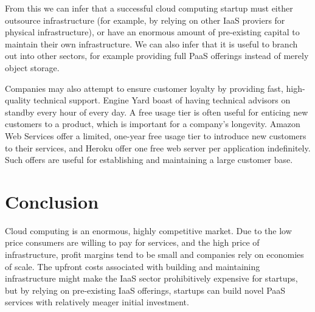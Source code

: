 \documentclass[a4paper]{proc}
\begin{document}
  From this we can infer that a successful cloud computing startup must either outsource infrastructure (for example, by relying on other IaaS proviers for physical infrastructure), or have an enormous amount of pre-existing capital to maintain their own infrastructure. We can also infer that it is useful to branch out into other sectors, for example providing full PaaS offerings instead of merely object storage.

  Companies may also attempt to ensure customer loyalty by providing fast, high-quality technical support. Engine Yard boast of having technical advisors on standby every hour of every day. A free usage tier is often useful for enticing new customers to a product, which is important for a company's longevity. Amazon Web Services offer a limited, one-year free usage tier to introduce new customers to their services, and Heroku offer one free web server per application indefinitely. Such offers are useful for establishing and maintaining a large customer base.

  \section{Conclusion}
  \label{sec:conclusion}

  Cloud computing is an enormous, highly competitive market. Due to the low price consumers are willing to pay for services, and the high price of infrastructure, profit margins tend to be small and companies rely on economies of scale. The upfront costs associated with building and maintaining infrastructure might make the IaaS sector prohibitively expensive for startups, but by relying on pre-existing IaaS offerings, startups can build novel PaaS services with relatively meager initial investment.

  \printbibliography
\end{document}
